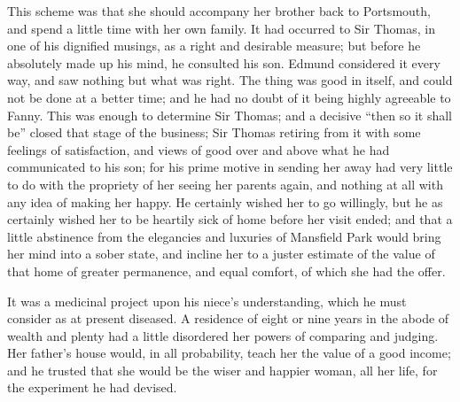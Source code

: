 This scheme was that she should accompany her brother
back to Portsmouth, and spend a little time with her
own family.  It had occurred to Sir Thomas, in one of his
dignified musings, as a right and desirable measure;
but before he absolutely made up his mind, he consulted
his son.  Edmund considered it every way, and saw nothing
but what was right.  The thing was good in itself,
and could not be done at a better time; and he had no doubt
of it being highly agreeable to Fanny.  This was enough
to determine Sir Thomas; and a decisive ``then so it shall be''
closed that stage of the business; Sir Thomas retiring
from it with some feelings of satisfaction, and views
of good over and above what he had communicated to his son;
for his prime motive in sending her away had very little
to do with the propriety of her seeing her parents again,
and nothing at all with any idea of making her happy.
He certainly wished her to go willingly, but he as certainly
wished her to be heartily sick of home before her visit ended;
and that a little abstinence from the elegancies and luxuries
of Mansfield Park would bring her mind into a sober state,
and incline her to a juster estimate of the value
of that home of greater permanence, and equal comfort,
of which she had the offer.

It was a medicinal project upon his niece's understanding,
which he must consider as at present diseased.
A residence of eight or nine years in the abode of wealth
and plenty had a little disordered her powers of comparing
and judging.  Her father's house would, in all probability,
teach her the value of a good income; and he trusted that
she would be the wiser and happier woman, all her life,
for the experiment he had devised.

